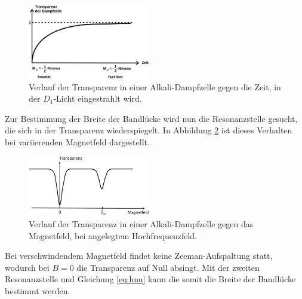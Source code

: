 \begin{figure}
	\centering
	\includegraphics[width=0.475\textwidth]{ressources/TransparenzZeit.png}
	\caption{Verlauf der Transparenz in einer Alkali-Dampfzelle gegen die Zeit, in der $D_1$-Licht eingestrahlt wird. \cite{skript}}
	\label{fig:TransparenzZeit}
\end{figure}


Zur Bestimmung der Breite der Bandlücke wird nun die Resonanzstelle gesucht, die sich in der Transparenz wiederspiegelt. In Abbildung \ref{fig:Resonanz} ist dieses Verhalten bei variierenden Magnetfeld dargestellt.

\begin{figure}
	\centering
	\includegraphics[width=0.475\textwidth]{ressources/Resonanz.png}
	\caption{Verlauf der Transparenz in einer Alkali-Dampfzelle gegen das Magnetfeld, bei angelegtem Hochfrequenzfeld. \cite{skript}}
	\label{fig:Resonanz}
\end{figure}

Bei verschwindendem Magnetfeld findet keine Zeeman-Aufspaltung statt, wodurch bei $B=0$ die Transparenz auf Null absingt. Mit der zweiten Resonanzstelle und Gleichung \ref{eq:hnu} kann die somit die Breite der Bandlücke bestimmt werden.







